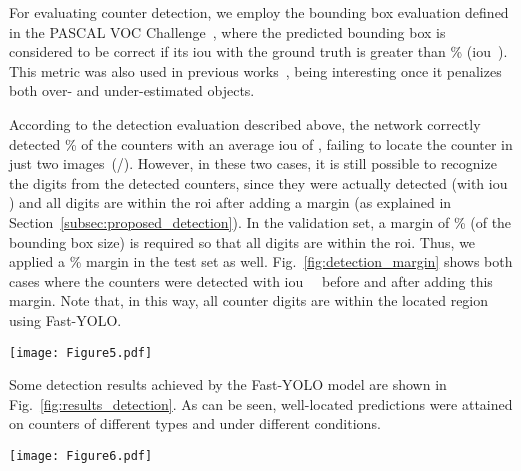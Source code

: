 For evaluating counter detection, we employ the bounding box evaluation defined in the PASCAL VOC Challenge~\cite{everingham2010pascalvoc}, where the predicted bounding box is considered to be correct if its \gls*{iou} with the ground truth is greater than \% (\gls*{iou}~). 
This metric was also used in previous works~\cite{nodari2011multineural,vanetti2013gas}, being interesting once it penalizes both over- and under-estimated objects.

According to the detection evaluation described above, the network correctly detected \% of the counters with an average \gls*{iou} of , failing to locate the counter in just two images~(/). However,  in these two cases, it is still possible to recognize the digits from the detected counters, since they were actually detected (with \gls*{iou} ) and all digits are within the \gls*{roi} after adding a margin (as explained in Section~\ref{subsec:proposed_detection}). In the validation set, a margin of \% (of the bounding box size) is required so that all digits are within the \gls*{roi}. Thus, we applied a \% margin in the test set as well. Fig.~\ref{fig:detection_margin} shows both cases where the counters were detected with \gls*{iou}~~ before and after adding this margin. Note that, in this way, all counter digits are within the located region using Fast-YOLO. 

\captionsetup[subfigure]{position=bottom}
\begin{figure*}[!htb]
	\begin{center}
	\texttt{[image: Figure5.pdf]}
	\end{center}
	\vspace{-3mm}
	\caption{Bounding boxes predicted by the Fast-YOLO model before~(a) and after~(b) adding the margin (\%~of the bounding box~size).}
	\label{fig:detection_margin}    
\end{figure*}

Some detection results achieved by the Fast-YOLO model are shown in Fig.~\ref{fig:results_detection}. 
As can be seen, well-located predictions were attained on counters of different types and under different conditions.

\begin{figure*}[!htb]
	\begin{center}
	\texttt{[image: Figure6.pdf]}
	\end{center}
	\vspace{-2mm}
	\caption{Samples of counter detection obtained with the Fast-YOLO model in the \dataset dataset.
	}
	\label{fig:results_detection}    
\end{figure*}


